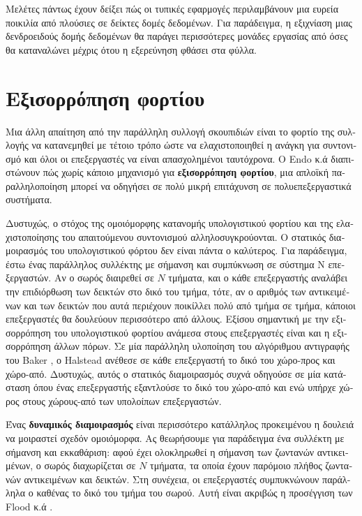 \begin{greek}
Μελέτες πάντως έχουν δείξει πώς οι τυπικές εφαρμογές περιλαμβάνουν
μια ευρεία ποικιλία από πλούσιες σε δείκτες δομές δεδομένων.
Για παράδειγμα, η εξιχνίαση μιας δενδροειδούς δομής δεδομένων
θα παράγει περισσότερες μονάδες εργασίας από όσες θα καταναλώνει
μέχρις ότου η εξερεύνηση φθάσει στα φύλλα.

\section{Εξισορρόπηση φορτίου}
Μια άλλη απαίτηση από την παράλληλη συλλογή σκουπιδιών είναι
το φορτίο της συλλογής να κατανεμηθεί με τέτοιο τρόπο ώστε να
ελαχιστοποιηθεί η ανάγκη για συντονισμό και όλοι οι επεξεργαστές
να είναι απασχολημένοι ταυτόχρονα. Ο Endo κ.ά \cite{DBLP:conf/sc/EndoTY97}
διαπιστώνουν πώς χωρίς κάποιο μηχανισμό για \textbf{εξισορρόπηση
φορτίου}, μια απλοϊκή παραλληλοποίηση μπορεί να οδηγήσει σε
πολύ μικρή επιτάχυνση σε πολυεπεξεργαστικά συστήματα.

Δυστυχώς, ο στόχος της ομοιόμορφης κατανομής υπολογιστικού φορτίου
και της ελαχιστοποίησης του απαιτούμενου συντονισμού αλληλοσυγκρούονται.
Ο στατικός διαμοιρασμός του υπολογιστικού φόρτου δεν είναι
πάντα ο καλύτερος. Για παράδειγμα, έστω ένας παράλληλος συλλέκτης
με σήμανση και συμπύκνωση σε σύστημα N επεξεργαστών. Αν ο σωρός
διαιρεθεί σε $N$ τμήματα, και ο κάθε επεξεργαστής αναλάβει την
επιδιόρθωση των δεικτών στο δικό του τμήμα, τότε, αν ο αριθμός
των αντικειμένων και των δεικτών που αυτά περιέχουν ποικίλλει
πολύ από τμήμα σε τμήμα, κάποιοι επεξεργαστές θα δουλεύουν
περισσότερο από άλλους. Εξίσου σημαντική με την εξισορρόπηση
του υπολογιστικού φορτίου ανάμεσα στους επεξεργαστές είναι
και η εξισορρόπηση άλλων πόρων. Σε μία παράλληλη υλοποίηση
του αλγόριθμου αντιγραφής του Baker \cite{DBLP:journals/cacm/Baker78},
ο Halstead \cite{DBLP:conf/lfp/Halstead84, DBLP:journals/toplas/Halstead85}
ανέθεσε σε κάθε επεξεργαστή το δικό του χώρο-προς και χώρο-από.
Δυστυχώς, αυτός ο στατικός διαμοιρασμός συχνά οδηγούσε σε μία
κατάσταση όπου ένας επεξεργαστής εξαντλούσε το δικό του χώρο-από
και ενώ υπήρχε χώρος στους χώρους-από των υπολοίπων επεξεργαστών.

Ένας \textbf{δυναμικός διαμοιρασμός} είναι περισσότερο κατάλληλος
προκειμένου η δουλειά να μοιραστεί σχεδόν ομοιόμορφα. Ας θεωρήσουμε
για παράδειγμα ένα συλλέκτη με σήμανση και εκκαθάριση: αφού έχει
ολοκληρωθεί η σήμανση των ζωντανών αντικειμένων, ο σωρός διαχωρίζεται
σε $Ν$ τμήματα, τα οποία έχουν παρόμοιο πλήθος ζωντανών αντικειμένων
και δεικτών. Στη συνέχεια, οι επεξεργαστές συμπυκνώνουν παράλληλα
ο καθένας το δικό του τμήμα του σωρού. Αυτή είναι ακριβώς η
προσέγγιση των Flood κ.ά \cite{DBLP:conf/jvm/FloodDSZ01}.


\end{greek}
